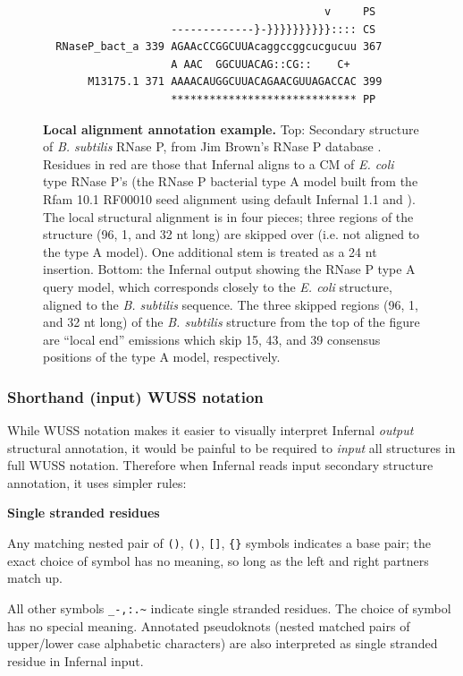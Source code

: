 \begin{figure}[tp]
\begin{center}
{\begin{BVerbatim}
                                            v     PS
                    -------------}-}}}}}}}}}}:::: CS
  RNaseP_bact_a 339 AGAAcCCGGCUUAcaggccggcucgucuu 367
                    A AAC  GGCUUACAG::CG::    C+ 
       M13175.1 371 AAAACAUGGCUUACAGAACGUUAGACCAC 399
                    ***************************** PP
\end{BVerbatim}
}
\end{center}
\caption{\small \textbf{Local alignment annotation example.} Top:
Secondary structure of \emph{B. subtilis} RNase P, from Jim Brown's
RNase P database \citep{Brown99}. Residues in red are those that
Infernal aligns to a CM of \emph{E. coli} type RNase P's
(the RNase P bacterial type A model built from the Rfam 10.1 RF00010
seed alignment using default Infernal 1.1  and
). The local structural alignment is in four pieces;
three regions of the structure (96, 1, and 32 nt long) are skipped
over (i.e. not aligned to the type A model). One additional stem is
treated as a 24 nt insertion.  Bottom: the Infernal 
output showing the RNase P type A query model, which corresponds
closely to the \emph{E. coli} structure, aligned to the
\emph{B. subtilis} sequence. The three skipped regions (96, 1, and 32
nt long) of the \emph{B. subtilis} structure from the top of the
figure are ``local end'' emissions which skip 15, 43, and 39 consensus
positions of the type A model, respectively.}
\label{fig:bsu-alignment}
\end{figure}

\subsubsection{Shorthand (input) WUSS notation}

While WUSS notation makes it easier to visually interpret
Infernal \emph{output} structural annotation, it would be
painful to be required to \emph{input} all structures in full WUSS
notation. Therefore when Infernal reads input secondary
structure annotation, it uses simpler rules:

\begin{sreitems}{\textbf{Single stranded residues}}
\item [\textbf{Base pairs}]
  Any matching nested pair of \verb+()+, \verb+()+, \verb+[]+, \verb+{}+
  symbols indicates a base pair; the exact choice of symbol has no
  meaning, so long as the left and right partners match up.

\item [\textbf{Single stranded residues}]
  All other symbols \verb+_-,:.~+ 
  indicate single stranded residues.
  The choice of symbol has no special meaning.
  Annotated pseudoknots (nested matched pairs of upper/lower case
  alphabetic characters) are also interpreted as single
  stranded residue in Infernal input.
\end{sreitems}

